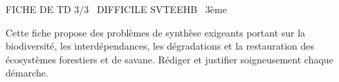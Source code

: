 \documentclass[11pt]{article}
\begin{document}
\begin{tcolorbox}[enhanced,colback=popink,colframe=popink,arc=10pt,boxrule=0pt,left=12pt,right=12pt,top=9pt,bottom=9pt]
{\color{white}\popxbold\small FICHE DE TD 3/3 \textbullet\ DIFFICILE \hfill SVTEEHB \textbullet\ 3ème\par}
\end{tcolorbox}
\vspace{4pt}
Cette fiche propose des problèmes de synthèse exigeants portant sur la biodiversité, les interdépendances, les dégradations et la restauration des écosystèmes forestiers et de savane. Rédiger et justifier soigneusement chaque démarche.
\end{document}
